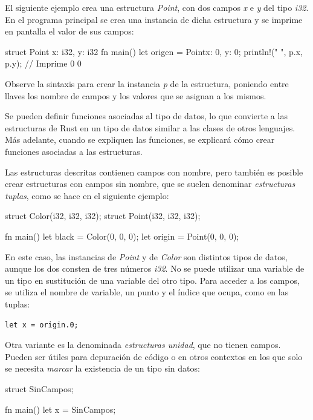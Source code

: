 El siguiente ejemplo crea una estructura \textit{Point}, con dos campos \textit{x} e \textit{y} del tipo \textit{i32}. En el programa principal se crea una instancia de dicha estructura y se imprime en pantalla el valor de sus campos:

\vspace{0.7em}
\begin{Codigo}
struct Point {
   x: i32,
   y: i32
}
fn main() {
   let origen = Point{x: 0, y: 0};
   println!("{} {}", p.x, p.y); // Imprime 0 0
}
\end{Codigo}

Observe la sintaxis para crear la instancia \textit{p} de la estructura, poniendo entre llaves los nombre de campos y los valores que se asignan a los mismos.

Se pueden definir funciones asociadas al tipo de datos, lo que convierte a las estructuras de Rust en un tipo de datos similar a las clases de otros lenguajes. Más adelante, cuando se expliquen las funciones, se explicará cómo crear funciones asociadas a las estructuras.

Las estructuras descritas contienen campos con nombre, pero también es posible crear estructuras con campos sin nombre, que se suelen denominar \textit{estructuras tuplas}, como se hace en el siguiente ejemplo:

\vspace{0.7em}
\begin{Codigo}
struct Color(i32, i32, i32);
struct Point(i32, i32, i32);

fn main() {
   let black = Color(0, 0, 0);
   let origin = Point(0, 0, 0);
}
\end{Codigo}

En este caso, las instancias de \textit{Point} y de \textit{Color} son distintos tipos de datos, aunque los dos consten de tres números \textit{i32}. No se puede utilizar una variable de un tipo en sustitución de una variable del otro tipo. Para acceder a los campos, se utiliza el nombre de variable, un punto y el índice que ocupa, como en las tuplas:

{\centering \texttt{let x = origin.0;} \par}

Otra variante es la denominada \textit{estructuras unidad}, que no tienen campos. Pueden ser útiles para depuración de código o en otros contextos en los que solo se necesita \textit{marcar} la existencia de un tipo sin datos:

\vspace{0.7em}
\begin{Codigo}
struct SinCampos;

fn main() {
   let x = SinCampos;
}
\end{Codigo}

